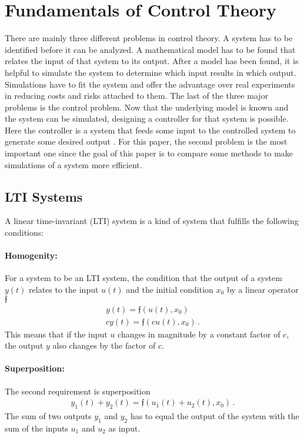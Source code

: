 \section{Fundamentals of Control Theory}
There are mainly three different problems in control theory.
A system has to be identified before it can be analyzed.
A mathematical model has to be found that relates the input of that system to its output.
After a model has been found, it is helpful to simulate the system to determine which input results in which output.
Simulations have to fit the system and offer the advantage over real experiments in reducing costs and risks attached to them.
The last of the three major problems is the control problem.
Now that the underlying model is known and the system can be simulated, designing a controller for that system is possible.
Here the controller is a system that feeds some input to the controlled system to generate some desired output \cite{DouglasBa}.
For this paper, the second problem is the most important one since the goal of this paper is to compare some methods to make simulations of a system more efficient.
\subsection{LTI Systems}
A linear time-invariant (LTI) system is a kind of system that fulfills the following conditions:
\paragraph{Homogenity:}
For a system to be an LTI system, the condition that the output of a system \(y(t)\) relates to the input \(u(t)\) and the initial condition \(x_0\) by a linear operator \(\mathfrak{f}\)
\begin{gather}
y(t) = \mathfrak{f}(u(t), x_0) \\
cy(t) = \mathfrak{f}(cu(t),  x_0) \,.
\end{gather}
This means that if the input \(u\) changes in magnitude by a constant factor of \(c\), the output \(y\) also changes by the factor of \(c\).
\paragraph{Superposition:}
The second requirement is superposition
\begin{gather}
y_1(t) + y_2(t) = \mathfrak{f}(u_1(t) + u_2(t), x_0) \,.
\end{gather}
The sum of two outputs \(y_1\) and \(y_2\) has to equal the output of the system with the sum of the inputs \(u_1\) and \(u_2\) as input.
